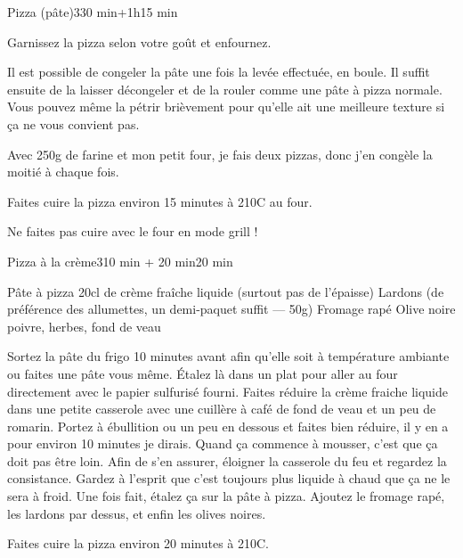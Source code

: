 \begin{recette}{Pizza (pâte)}{3}{30 min+1h}{15 min}
\begin{preparation}
\etape Garnissez la pizza selon votre goût et enfournez.
\end{preparation}

\begin{remarque}
Il est possible de congeler la pâte une fois la levée effectuée, en boule. Il suffit ensuite de la laisser décongeler et de la rouler comme une pâte à pizza normale. Vous pouvez même la pétrir brièvement pour qu'elle ait une meilleure texture si ça ne vous convient pas.

Avec 250g de farine et mon petit four, je fais deux pizzas, donc j'en congèle la moitié à chaque fois.
\end{remarque}


\begin{cuisson}
Faites cuire la pizza environ 15 minutes à 210\degres C au four.

\begin{attention}
Ne faites pas cuire avec le four en mode grill !
\end{attention}

\end{cuisson}


\end{recette}

\begin{recette}{Pizza à la crème}{3}{10 min + 20 min}{20 min}
\begin{ingredients}
\ingredient Pâte à pizza
\ingredient 20cl de crème fraîche liquide (surtout pas de l'épaisse)
\ingredient Lardons (de préférence des allumettes, un demi-paquet suffit --- 50g)
\ingredient Fromage rapé
\ingredient Olive noire
\ingredient poivre, herbes, fond de veau
\end{ingredients}

\begin{preparation}
\etape Sortez la pâte du frigo 10 minutes avant afin qu'elle soit à température ambiante ou faites une pâte vous même.
\etape Étalez là dans un plat pour aller au four directement avec le papier sulfurisé fourni.
\etape Faites réduire la crème fraiche liquide dans une petite casserole avec une cuillère à café de fond de veau et un peu de romarin. Portez à ébullition ou un peu en dessous et faites bien réduire, il y en a pour environ 10 minutes je dirais. Quand ça commence à mousser, c'est que ça doit pas être loin. Afin de s'en assurer, éloigner la casserole du feu et regardez la consistance. Gardez à l'esprit que c'est toujours plus liquide à chaud que ça ne le sera à froid.
\etape Une fois fait, étalez ça sur la pâte à pizza. Ajoutez le fromage rapé, les lardons par dessus, et enfin les olives noires.
\end{preparation}

\begin{cuisson}
Faites cuire la pizza environ 20 minutes à 210\degres C.
\end{cuisson}


\end{recette}

